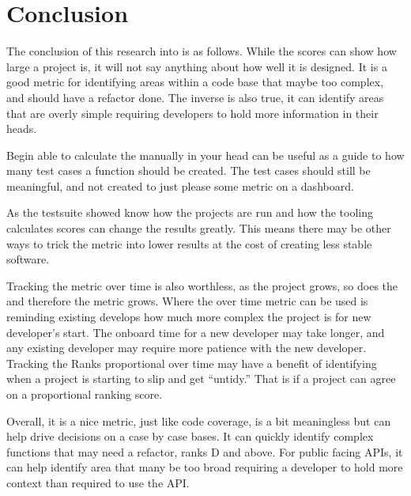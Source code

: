 \section{Conclusion}

The conclusion of this research into \cc is as follows.
While the \cc scores can show how large a project is, it will not say anything about how well it is designed.
It is a good metric for identifying areas within a code base that maybe too complex, and should have a refactor done.
The inverse is also true, it can identify areas that are overly simple requiring developers to hold more information in their heads.

Begin able to calculate the \cc manually in your head can be useful as a guide to how many test cases a function should be created.
The test cases should still be meaningful, and not created to just please some metric on a dashboard.

As the testsuite showed know how the projects are run and how the tooling calculates \cc scores can change the results greatly.
This means there may be other ways to trick the metric into lower results at the cost of creating less stable software.

Tracking the metric over time is also worthless, as the project grows, so does the \cc and therefore the metric grows.
Where the over time metric can be used is reminding existing develops how much more complex the project is for new developer's start.
The onboard time for a new developer may take longer, and any existing developer may require more patience with the new developer.
Tracking the Ranks proportional over time may have a benefit of identifying when a project is starting to slip and get ``untidy.''
That is if a project can agree on a proportional ranking score.

Overall, it is a nice metric, just like code coverage, is a bit meaningless but can help drive decisions on a case by case bases.
It can quickly identify complex functions that may need a refactor, ranks D and above.
For public facing APIs, it can help identify area that many be too broad requiring a developer to hold more context than required to use the API.